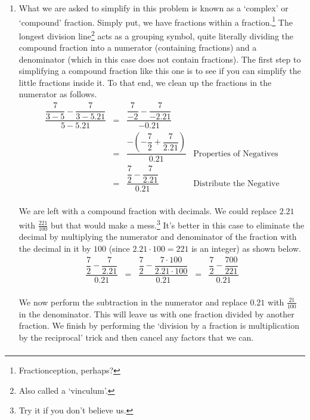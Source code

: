 \documentclass{ximera}
\begin{document}
\begin{example}
\begin{enumerate}
\item What we are asked to simplify in this problem is known as a  `complex' or `compound' fraction.  Simply put, we have fractions within a fraction.\footnote{Fractionception, perhaps?}  The longest division line\footnote{Also called a `vinculum'.} acts as a grouping symbol, quite literally dividing the compound fraction into a numerator (containing fractions) and a denominator (which in this case does not contain fractions).  The first step to simplifying a compound fraction like this one is to see if you can simplify the little fractions inside it.  To that end, we clean up the fractions in the numerator as follows.\[ \begin{array}{rclr}

 \dfrac{\dfrac{7}{3-5} - \dfrac{7}{3-5.21}}{5-5.21} & = & \dfrac{\dfrac{7}{-2} - \dfrac{7}{-2.21}}{-0.21} & \\ [10pt]
                                                    & = & \dfrac{-\left(-\dfrac{7}{2} + \dfrac{7}{2.21}\right)}{0.21} & \text{Properties of Negatives} \\ [10pt]
																										& = & \dfrac{\dfrac{7}{2} - \dfrac{7}{2.21}}{0.21} & \text{Distribute the Negative} \\ \end{array}\]
																										
We are left with a compound fraction with decimals.  We could replace $2.21$ with $\frac{221}{100}$ but that would make a mess.\footnote{Try it if you don't believe us.}  It's better in this case to eliminate the decimal by multiplying the numerator and denominator of the fraction with the decimal in it by $100$ (since $2.21 \cdot 100 = 221$ is an integer) as shown below.\[ \begin{array}{rclcl}

\dfrac{\dfrac{7}{2} - \dfrac{7}{2.21}}{0.21} & = & \dfrac{ \dfrac{7}{2} - \dfrac{7 \cdot 100}{2.21 \cdot 100}}{0.21} & = & \dfrac{\dfrac{7}{2} - \dfrac{700}{221}}{0.21}\\ \end{array}\]

We now perform the subtraction in the numerator and replace $0.21$ with $\frac{21}{100}$ in the denominator.  This will leave us with one fraction divided by another fraction.  We finish by performing the `division by a fraction is multiplication by the reciprocal' trick and then cancel any factors that we can.\[ \begin{array}{rclcl}
																										

\end{array}\]
\end{enumerate}
\end{example}
\end{document}

